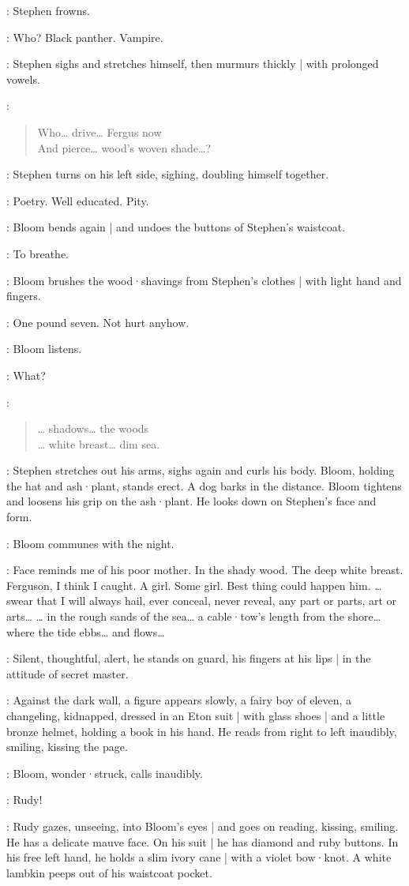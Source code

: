 :
Stephen frowns.

\Stephen:
Who?
Black panther.
Vampire.

:
Stephen sighs and stretches himself,
then murmurs thickly |
with prolonged vowels.

\Stephen:
\begin{verse}
    Who… drive… Fergus now\\
    And pierce… wood's woven shade…?
\end{verse}

:
Stephen turns on his left side,
sighing,
doubling himself together.

\Bloom:
Poetry.
Well educated.
Pity.

:
Bloom bends again |
and undoes the buttons of Stephen's waistcoat.

\Bloom:
To breathe.

:
Bloom brushes the wood·shavings from Stephen's clothes |
with light hand and fingers.

\Bloom:
One pound seven.
Not hurt anyhow.

:
Bloom listens.

\Bloom:
What?

\Stephen:
\begin{verse}
   … shadows… the woods\\
   … white breast… dim sea.
\end{verse}

:
Stephen stretches out his arms,
sighs again and curls his body.
Bloom,
holding the hat and ash·plant,
stands erect.
A dog barks in the distance.
Bloom tightens and loosens his grip on the ash·plant.
He looks down on Stephen's face and form.

:
Bloom communes with the night.

\Bloom:
Face reminds me of his poor mother.
In the shady wood.
The deep white breast.
Ferguson,
I think I caught.
%
A girl.
Some girl.
Best thing could happen him.
… swear that I will always hail,
ever conceal,
never reveal,
any part or parts,
art or arts…
… in the rough sands of the sea…
a cable·tow's length from the shore…
where the tide ebbs…
and flows…

:
Silent,
thoughtful,
alert,
he stands on guard,
his fingers at his lips |
in the attitude of secret master.

:
Against the dark wall,
a figure appears slowly,
a fairy boy of eleven,
a changeling,
kidnapped,
dressed in an Eton suit |
with glass shoes |
and a little bronze helmet,
holding a book in his hand.
He reads from right to left inaudibly,
smiling,
kissing the page.%

:
Bloom,
wonder·struck,
calls inaudibly.

\Bloom:
Rudy!

:
Rudy gazes,
unseeing,
into Bloom's eyes |
and goes on reading,
kissing,
smiling.
He has a delicate mauve face.
On his suit |
he has diamond and ruby buttons.
In his free left hand,
he holds a slim ivory cane |
with a violet bow·knot.
A white lambkin peeps out of his waistcoat pocket.
